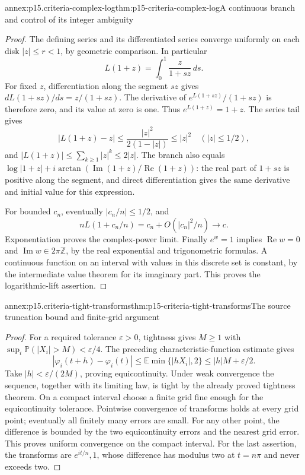 \begin{annexitem}{annex:p15.criteria-complex-log}{thm:p15-criteria-complex-log}{A continuous branch and control of its integer ambiguity}
\begin{proof}
The defining series and its differentiated series converge
uniformly on each disk \(|z|\leq r<1\), by geometric
comparison. In particular
\[
 L(1+z)=\int_0^1\frac{z}{1+sz}\,ds.
\]
For fixed \(z\), differentiation along the segment \(sz\)
gives \(dL(1+sz)/ds=z/(1+sz)\).
The derivative of \(e^{L(1+sz)}/(1+sz)\) is therefore
zero, and its value at zero is one. Thus \(e^{L(1+z)}=1+z\).
The series tail gives
\[
 |L(1+z)-z|\leq\frac{|z|^2}{2(1-|z|)}\leq|z|^2
 \quad(|z|\leq1/2),
\]
and \(|L(1+z)|\leq\sum_{k\geq1}|z|^k\leq2|z|\).
The branch also equals
\(\log|1+z|+i\arctan(\operatorname{Im}(1+z)/
                         \operatorname{Re}(1+z))\):
the real part of \(1+sz\) is positive along the segment,
and direct differentiation gives the same derivative
and initial value for this expression.

For bounded \(c_n\), eventually \(|c_n/n|\leq1/2\), and
\[
 nL(1+c_n/n)=c_n+O(|c_n|^2/n)\longrightarrow c.
\]
Exponentiation proves the complex-power limit.
Finally \(e^w=1\) implies \(\operatorname{Re}w=0\)
and \(\operatorname{Im}w\in2\pi\mathbb Z\), by the
real exponential and trigonometric formulas.
A continuous function on an interval with values in
this discrete set is constant, by the intermediate
value theorem for its imaginary part.
This proves the logarithmic-lift assertion.
\end{proof}
\end{annexitem}

\begin{annexitem}{annex:p15.criteria-tight-transforms}{thm:p15-criteria-tight-transforms}{The source truncation bound and finite-grid argument}
\begin{proof}
For a required tolerance \(\varepsilon>0\), tightness gives
\(M\geq1\) with
\(\sup_i\mathbb P(|X_i|>M)<\varepsilon/4\).
The preceding characteristic-function estimate gives
\[
 |\varphi_i(t+h)-\varphi_i(t)|
 \leq\mathbb E\min\{|hX_i|,2\}
 \leq |h|M+\varepsilon/2.
\]
Take \(|h|<\varepsilon/(2M)\), proving equicontinuity.
Under weak convergence the sequence, together with its
limiting law, is tight by the already proved tightness
theorem. On a compact interval choose a finite grid
fine enough for the equicontinuity tolerance.
Pointwise convergence of transforms holds at every
grid point; eventually all finitely many errors are
small. For any other point, the difference is bounded
by the two equicontinuity errors and the nearest grid
error. This proves uniform convergence on the compact
interval. For the last assertion, the transforms are
\(e^{it/n},1\), whose difference has modulus two at
\(t=n\pi\) and never exceeds two.
\end{proof}
\end{annexitem}

